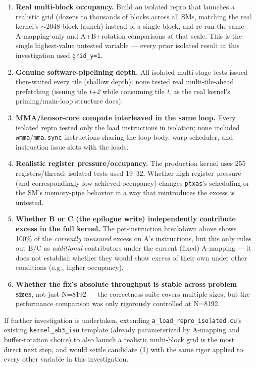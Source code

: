 \documentclass[11pt]{article}
\begin{document}
\begin{enumerate}
\item \textbf{Real multi-block occupancy.} Build an isolated repro that launches a realistic grid (dozens to thousands of blocks across all SMs, matching the real kernel's $\sim$2048-block launch) instead of a single block, and re-run the same A-mapping-only and A+B+rotation comparisons at that scale. This is the single highest-value untested variable --- every prior isolated result in this investigation used \texttt{grid\_y=1}.
\item \textbf{Genuine software-pipelining depth.} All isolated multi-stage tests issued-then-waited every tile (shallow depth); none tested real multi-tile-ahead prefetching (issuing tile \emph{t+2} while consuming tile \emph{t}, as the real kernel's priming/main-loop structure does).
\item \textbf{MMA/tensor-core compute interleaved in the same loop.} Every isolated repro tested only the load instructions in isolation; none included \texttt{wmma}/\texttt{mma.sync} instructions sharing the loop body, warp scheduler, and instruction issue slots with the loads.
\item \textbf{Realistic register pressure/occupancy.} The production kernel uses 255 registers/thread; isolated tests used 19--32. Whether high register pressure (and correspondingly low achieved occupancy) changes \texttt{ptxas}'s scheduling or the SM's memory-pipe behavior in a way that reintroduces the excess is untested.
\item \textbf{Whether B or C (the epilogue write) independently contribute excess in the full kernel.} The per-instruction breakdown above shows 100\% of the \emph{currently measured} excess on A's instructions, but this only rules out B/C as \emph{additional} contributors under the current (fixed) A-mapping --- it does not establish whether they would show excess of their own under other conditions (e.g., higher occupancy).
\item \textbf{Whether the fix's absolute throughput is stable across problem sizes}, not just N=8192 --- the correctness suite covers multiple sizes, but the performance comparison was only rigorously controlled at N=8192.
\end{enumerate}

If further investigation is undertaken, extending \texttt{a\_load\_repro\_isolated.cu}'s existing \texttt{kernel\_ab3\_iso} template (already parameterized by A-mapping and buffer-rotation choice) to also launch a realistic multi-block grid is the most direct next step, and would settle candidate (1) with the same rigor applied to every other variable in this investigation.
\end{document}
